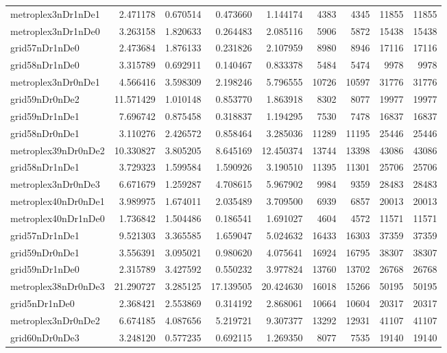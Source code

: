 \begin{longtable}{|l|r|r|r|r|r|r|r|r|}
metroplex3nDr1nDe1 & 2.471178 & 0.670514 & 0.473660 & 1.144174 & 4383 & 4345 & 11855 & 11855 \\
metroplex3nDr1nDe0 & 3.263158 & 1.820633 & 0.264483 & 2.085116 & 5906 & 5872 & 15438 & 15438 \\
grid57nDr1nDe0 & 2.473684 & 1.876133 & 0.231826 & 2.107959 & 8980 & 8946 & 17116 & 17116 \\
grid58nDr1nDe0 & 3.315789 & 0.692911 & 0.140467 & 0.833378 & 5484 & 5474 & 9978 & 9978 \\
metroplex3nDr0nDe1 & 4.566416 & 3.598309 & 2.198246 & 5.796555 & 10726 & 10597 & 31776 & 31776 \\
grid59nDr0nDe2 & 11.571429 & 1.010148 & 0.853770 & 1.863918 & 8302 & 8077 & 19977 & 19977 \\
grid59nDr1nDe1 & 7.696742 & 0.875458 & 0.318837 & 1.194295 & 7530 & 7478 & 16837 & 16837 \\
grid58nDr0nDe1 & 3.110276 & 2.426572 & 0.858464 & 3.285036 & 11289 & 11195 & 25446 & 25446 \\
metroplex39nDr0nDe2 & 10.330827 & 3.805205 & 8.645169 & 12.450374 & 13744 & 13398 & 43086 & 43086 \\
grid58nDr1nDe1 & 3.729323 & 1.599584 & 1.590926 & 3.190510 & 11395 & 11301 & 25706 & 25706 \\
metroplex3nDr0nDe3 & 6.671679 & 1.259287 & 4.708615 & 5.967902 & 9984 & 9359 & 28483 & 28483 \\
metroplex40nDr0nDe1 & 3.989975 & 1.674011 & 2.035489 & 3.709500 & 6939 & 6857 & 20013 & 20013 \\
metroplex40nDr1nDe0 & 1.736842 & 1.504486 & 0.186541 & 1.691027 & 4604 & 4572 & 11571 & 11571 \\
grid57nDr1nDe1 & 9.521303 & 3.365585 & 1.659047 & 5.024632 & 16433 & 16303 & 37359 & 37359 \\
grid59nDr0nDe1 & 3.556391 & 3.095021 & 0.980620 & 4.075641 & 16924 & 16795 & 38307 & 38307 \\
grid59nDr1nDe0 & 2.315789 & 3.427592 & 0.550232 & 3.977824 & 13760 & 13702 & 26768 & 26768 \\
metroplex38nDr0nDe3 & 21.290727 & 3.285125 & 17.139505 & 20.424630 & 16018 & 15266 & 50195 & 50195 \\
grid5nDr1nDe0 & 2.368421 & 2.553869 & 0.314192 & 2.868061 & 10664 & 10604 & 20317 & 20317 \\
metroplex3nDr0nDe2 & 6.674185 & 4.087656 & 5.219721 & 9.307377 & 13292 & 12931 & 41107 & 41107 \\
grid60nDr0nDe3 & 3.248120 & 0.577235 & 0.692115 & 1.269350 & 8077 & 7535 & 19140 & 19140 \\

\end{longtable}
